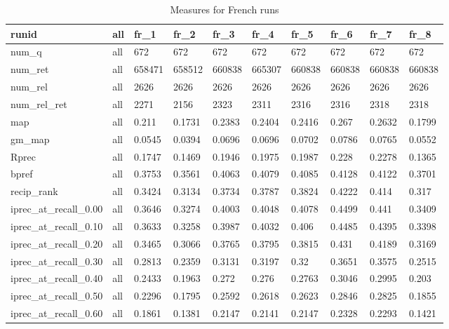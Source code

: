 \begin{table}[h!]
\caption{Measures for French runs}
  \label{tab:all-measures-french}
    \centering
    \begin{tabular}{|l|l|l|l|l|l|l|l|l|l|}
    	\toprule
        runid & all & fr\_1 & fr\_2 & fr\_3 & fr\_4 & fr\_5 & fr\_6 & fr\_7 & fr\_8 \\ \midrule
        num\_q & all & 672 & 672 & 672 & 672 & 672 & 672 & 672 & 672 \\ 
        num\_ret & all & 658471 & 658512 & 660838 & 665307 & 660838 & 660838 & 660838 & 660838 \\ 
        num\_rel & all & 2626 & 2626 & 2626 & 2626 & 2626 & 2626 & 2626 & 2626 \\ 
        num\_rel\_ret & all & 2271 & 2156 & 2323 & 2311 & 2316 & 2316 & 2318 & 2318 \\ \midrule
        map & all & 0.211 & 0.1731 & 0.2383 & 0.2404 & 0.2416 & 0.267 & 0.2632 & 0.1799 \\ 
        gm\_map & all & 0.0545 & 0.0394 & 0.0696 & 0.0696 & 0.0702 & 0.0786 & 0.0765 & 0.0552 \\ \midrule
        Rprec & all & 0.1747 & 0.1469 & 0.1946 & 0.1975 & 0.1987 & 0.228 & 0.2278 & 0.1365 \\ 
        bpref & all & 0.3753 & 0.3561 & 0.4063 & 0.4079 & 0.4085 & 0.4128 & 0.4122 & 0.3701 \\ 
        recip\_rank & all & 0.3424 & 0.3134 & 0.3734 & 0.3787 & 0.3824 & 0.4222 & 0.414 & 0.317 \\ \midrule
        iprec\_at\_recall\_0.00 & all & 0.3646 & 0.3274 & 0.4003 & 0.4048 & 0.4078 & 0.4499 & 0.441 & 0.3409 \\ 
        iprec\_at\_recall\_0.10 & all & 0.3633 & 0.3258 & 0.3987 & 0.4032 & 0.406 & 0.4485 & 0.4395 & 0.3398 \\ 
        iprec\_at\_recall\_0.20 & all & 0.3465 & 0.3066 & 0.3765 & 0.3795 & 0.3815 & 0.431 & 0.4189 & 0.3169 \\ 
        iprec\_at\_recall\_0.30 & all & 0.2813 & 0.2359 & 0.3131 & 0.3197 & 0.32 & 0.3651 & 0.3575 & 0.2515 \\ 
        iprec\_at\_recall\_0.40 & all & 0.2433 & 0.1963 & 0.272 & 0.276 & 0.2763 & 0.3046 & 0.2995 & 0.203 \\ 
        iprec\_at\_recall\_0.50 & all & 0.2296 & 0.1795 & 0.2592 & 0.2618 & 0.2623 & 0.2846 & 0.2825 & 0.1855 \\ 
        iprec\_at\_recall\_0.60 & all & 0.1861 & 0.1381 & 0.2147 & 0.2141 & 0.2147 & 0.2328 & 0.2293 & 0.1421 \\ 

\end{tabular}
\end{table}
